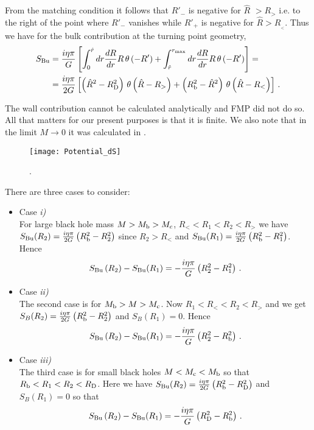\documentclass[a4paper,11pt]{article}
\numberwithin{equation}{section}
\newcommand{\citep}{\cite}
\newcommand{\be}{\begin{equation}}
\newcommand{\ee}{\end{equation}}
\numberwithin{equation}{section}
\begin{document}
From the matching condition it follows that $R'_{-}$ is negative
for $\hat{R}$ $>R_{>}$ i.e. to the right of the point where $R'_{-}$
vanishes while $R'_{+}$ is negative for $\hat{R}>R_{_{<}}$. Thus
we have for the bulk contribution at the turning point geometry,
\begin{align}
S_{{\rm Bu}} & =\frac{i\eta\pi}{G}\left[\int_{0}^{\hat{r}}dr\frac{dR}{dr}R \, \theta\left(-R'\right)+\int_{\hat{r}}^{r_{\rm max}}dr\frac{dR}{dr}R \, \theta\left(-R'\right)\right] = \nonumber \\
 & =\frac{i\eta\pi}{2G}\left[\left(\hat{R}^{2}-R_{{\rm D}}^{2}\right)\,\theta\left(\hat{R}-R_{>}\right)+\left(R_{{\rm b}}^{2}-\hat{R}^{2}\right)\,\theta\left(\hat{R}-R_{<}\right)\right] \,.\label{eq:SbtodS}
\end{align}

The wall contribution cannot be calculated analytically and FMP did
not do so. All that matters for our present purposes is that it is
finite. We also note that in the limit $M\rightarrow0$ it was calculated in \citep{Bachlechner:2016mtp,DeAlwis:2019rxg}.

\begin{figure}[h!] 
\begin{center} 
\texttt{[image: Potential\_dS]}
\caption{\footnotesize{.} \label{fig:potentialdS}}
\end{center} 
\end{figure}

There are three cases to consider: 
\begin{itemize}[leftmargin=*]
\item[]{Case \textit{i)}}\\
For large black hole mass $M>M_{{\rm b}}>M_{c}$, $R_{<}<R_{1}<R_{2}<R_{>}$
we have $S_{{\rm Bu}}(R_{2})=\frac{i\eta\pi}{2G}\left(R_{{\rm b}}^{2}-R_{2}^{2}\right)$
since $R_{2}>R_{<}$ and $S_{{\rm Bu}}(R_{1})=\frac{i\eta\pi}{2G}\left(R_{{\rm b}}^{2}-R_{1}^{2}\right)$.
Hence
\be
\label{eq:FMP1}
S_{{\rm Bu}}\left(R_{2}\right)-S_{{\rm Bu}}(R_{1})=-\frac{i\eta\pi}{G}\left(R_{{\rm 2}}^{2}-R_{1}^{2}\right)\,.
\ee

\item[]{Case \textit{ii)}}\\
The second case is for $M_{{\rm b}}>M>M_{{\rm c}}$. Now $R_{1}<R_{<}<R_{2}<R_{>}$
and we get $S_{B}(R_{2})=\frac{i\eta\pi}{2G}\left(R_{{\rm b}}^{2}-R_{2}^{2}\right)$
and $S_{B}(R_{1})=0$. Hence
\be
\label{eq:FMP2}
S_{{\rm Bu}}\left(R_{2}\right)-S_{{\rm Bu}}(R_{1})=-\frac{i\eta\pi}{G}\left(R_{{\rm 2}}^{2}-R_{{\rm b}}^{2}\right) \,.
\ee

\item[]{Case \textit{iii)}}\\
The third case is for small black holes $M<M_{{\rm c}}<M_{{\rm b}}$
so that $R_{{\rm b}}<R_{1}<R_{2}<R_{{\rm D}}$. Here we have $S_{{\rm Bu}}(R_{2})=\frac{i\eta\pi}{2G}\left(R_{{\rm b}}^{2}-R_{{\rm D}}^{2}\right)$
and $S_{B}(R_{1})=0$ so that
\be
\label{eq:FMP3}
S_{{\rm Bu}}\left(R_{2}\right)-S_{{\rm Bu}}(R_{1})=-\frac{i\eta\pi}{G}\left(R_{{\rm {\rm D}}}^{2}-R_{{\rm b}}^{2}\right) \,.
\ee
\end{itemize}
\end{document}
